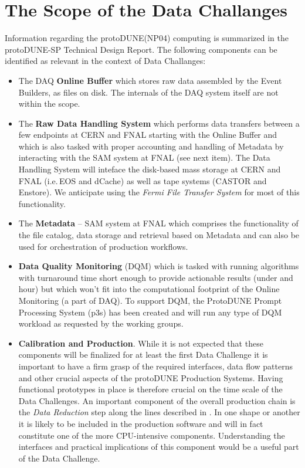 \documentclass[pdftex,12pt,letter]{article}
\newcommand{\pd}{protoDUNE\xspace}
\begin{document}
\section{The Scope of the Data Challanges}
Information regarding the \pd (NP04) computing is summarized in the \pd-SP Technical Design Report\cite{docdb1794}.
The following components can be identified as relevant in the context of Data Challanges:
\begin{itemize}
\item The DAQ \textbf{Online Buffer} which stores raw data assembled by the Event Builders, as files on disk. The internals
of the DAQ system itself are not within the scope.

\item The \textbf{Raw Data Handling System}\cite{docdb1212}  which performs data transfers between a few endpoints
at CERN and FNAL starting with the Online Buffer and which is also tasked with proper accounting and handling of Metadata
by interacting with the SAM system at FNAL (see next item). The Data Handling System will inteface the disk-based mass storage
at CERN and FNAL (i.e.\,EOS and dCache) as well as tape systems (CASTOR and Enstore). We anticipate using the \textit{Fermi
File Transfer System}\cite{fts} for most of this functionality.

\item The \textbf{Metadata}  -- SAM system at FNAL which comprises the functionality of the file catalog, data storage and
retrieval based on Metadata and can also be used for orchestration of production workflows.

\item \textbf{Data Quality Monitoring} (DQM) which is tasked with running algorithms with turnaround time short enough to provide
actionable results (under and hour) but which won't fit into the computational footprint of the Online Monitoring (a part of DAQ).
To support DQM, the ProtoDUNE Prompt Processing System (p3s) has been created and will run any type of DQM workload
as requested by the working groups.

\item \textbf{Calibration and Production}. While it is not expected that these components will be finalized for at least the first Data
Challenge it is important to have a firm grasp of the required interfaces, data flow patterns and other crucial aspects of
the \pd Production Systems. Having functional prototypes in place is therefore crucial on the time scale of the Data Challenges.
An important component of the overall production chain is the \textit{Data Reduction} step along the lines described
in \cite{docdb2089}. In one shape or another it is likely to be included in the production software and will in fact constitute
one of the more CPU-intensive components. Understanding the interfaces and practical implications of this component would
be a useful part of the Data Challenge.


\end{itemize}
\end{document}
